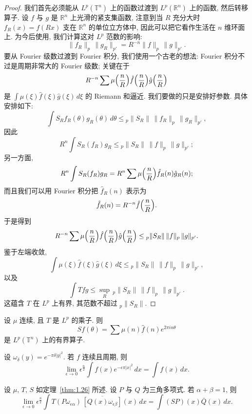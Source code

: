 \begin{proof}
我们首先必须能从 $L^p(\mathbb{T}^n)$ 上的函数过渡到 $L^p(\mathbb{R}^n)$ 上的函数, 然后转移算子. 设 $f$ 与 $g$ 是 $\mathbb{R}^n$ 上光滑的紧支集函数, 注意到当 $R$ 充分大时 $f_R(x)=f(Rx)$ 支在 $\mathbb{R}^n$ 的单位立方体中, 因此可以把它看作生活在 $n$ 维环面上. 为今后使用, 我们计算这对 $L^p$ 范数的影响:
\[
\|f_R\|_p\,\|g_R\|_{p'}=R^{-n}\|f\|_p\,\|g\|_{p'}.
\]
要从 Fourier 级数过渡到 Fourier 积分, 我们使用一个古老的想法: Fourier 积分不过是周期非常大的 Fourier 级数; 关键在于
\[
R^{-n}\sum\mu\Bigl(\frac{n}{R}\Bigr)\hat{f}\Bigl(\frac{n}{R}\Bigr)\hat{g}\Bigl(\frac{n}{R}\Bigr)
\]
是 $\int\mu(\xi)\hat{f}(\xi)\hat{g}(\xi)\,d\xi$ 的 Riemann 和逼近. 我们要做的只是安排好参数. 具体安排如下:
\[
\int S_Rf_R(\theta)g_R(\theta)\,d\theta\leq{}_p\|S_R\|\,\|f_R\|_p\,\|g_R\|_{p'},
\]
因此
\[
R^n\int S_R(f_R)g_R\leq{}_p\|S_R\|\,\|f\|_p\,\|g\|_{p'};
\]
另一方面,
\[
R^n\int S_R(f_R)g_R=R^n\sum\mu\Bigl(\frac{n}{R}\Bigr)\hat{f}_R(n)\hat{g}_R(n);
\]
而且我们可以用 Fourier 积分把 $\hat{f}_R(n)$ 表示为
\[
\hat{f}_R(n)=R^{-n}\hat{f}\Bigl(\frac{n}{R}\Bigr).
\]
于是得到
\[
R^{-n}\sum\mu\Bigl(\frac{n}{R}\Bigr)\hat{f}\Bigl(\frac{n}{R}\Bigr)\hat{g}\Bigl(\frac{n}{R}\Bigr)
\leq{}_p\|S_R\|\,\|f\|_p\,\|g\|_{p'}.
\]
鉴于左端收敛,
\[
\int\mu(\xi)\hat{f}(\xi)\hat{g}(\xi)\,d\xi\leq{}_p\|S_R\|\,\|f\|_p\,\|g\|_{p'},
\]
以及
\[
\int Tfg\leq\sup_R\,{}_p\|S_R\|\,\|f\|_p\,\|g\|_{p'}.
\]
这蕴含 $T$ 在 $L^p$ 上有界, 其范数不超过 ${}_p\|S_R\|$.
\end{proof}

\begin{theorem}\label{thm:1.26}
设 $\mu$ 连续, 且 $T$ 是 $L^p$ 的乘子. 则
\[
Sf(\theta)=\sum\mu(n)\hat{f}(n)e^{2\pi in\theta}
\]
是 $L^p(\mathbb{T}^n)$ 上的有界算子.
\end{theorem}

\begin{lemma}\label{lem:1.27}
设 $\omega_{\delta}(y)=e^{-\pi\delta|y|^2}$. 若 $f$ 连续且周期, 则
\[
\lim_{\epsilon\to0}\epsilon^{\frac{n}{2}}\int f(x)e^{-\epsilon\pi|x|^2}\,dx=\int f(x)\,dx.
\]
\end{lemma}

\begin{lemma}\label{lem:1.28}
设 $\mu$, $T$, $S$ 如定理~\ref{thm:1.26} 所述. 设 $P$ 与 $Q$ 为三角多项式. 若 $\alpha+\beta=1$, 则
\[
\lim_{\epsilon\to0}\epsilon^{\frac{n}{2}}\int T(P\omega_{\epsilon\alpha})\,\overline{[Q(x)\omega_{\epsilon\beta}]}(x)\,dx=\int(SP)(x)\bar{Q}(x)\,dx.
\]
\end{lemma}

